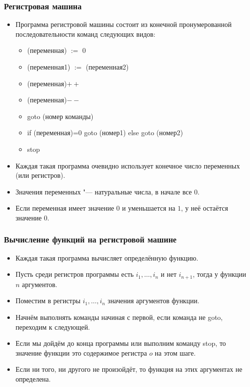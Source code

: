 \documentclass[10pt]{beamer}
\begin{document}
\begin{frame}
    \frametitle{Регистровая машина}
    \begin{itemize}
        \item Программа регистровой машины состоит из конечной пронумерованной последовательности команд следующих видов:
        \begin{itemize}
            \item (переменная) $:=$ 0
            \item (переменная1) $:=$ (переменная2)
            \item (переменная)$++$
            \item (переменная)$--$
            \item goto (номер команды)
            \item if (переменная)=0 goto (номер1) else goto (номер2)
            \item stop
        \end{itemize}
        \item Каждая такая программа очевидно использует конечное число переменных (или регистров).
        \item Значения переменных "--- натуральные числа, в начале все $0$.
        \item Если переменная имеет значение $0$ и уменьшается на $1$, у неё остаётся значение $0$.
    \end{itemize}
\end{frame}

\begin{frame}
    \frametitle{Вычисление функций на регистровой машине}
    \begin{itemize}
        \item Каждая такая программа вычисляет определённую функцию.
        \item Пусть среди регистров программы есть $i_1, \ldots, i_n$ и нет $i_{n+1}$, тогда у функции $n$ аргументов.
        \item Поместим в регистры $i_1, \ldots, i_n$ значения аргументов функции.
        \item Начнём выполнять команды начиная с первой, если команда не goto, переходим к следующей.
        \item Если мы дойдём до конца программы или выполним команду stop, то значение функции это содержимое регистра $o$ на этом шаге.
        \item Если ни того, ни другого не произойдёт, то функция на этих аргументах не определена.
    \end{itemize}
\end{frame}
\end{document}
